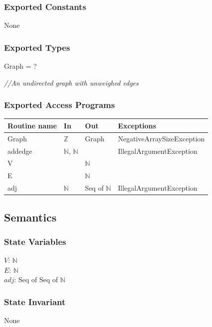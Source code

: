 \documentclass[12pt]{article}
\begin{document}
\subsubsection* {Exported Constants}

None

\subsubsection* {Exported Types}

Graph = ?

\noindent \textit{//An undirected graph with unweighed edges}

\subsubsection* {Exported Access Programs}

\begin{tabular}{| l | l | l | l |}
\hline
\textbf{Routine name} & \textbf{In} & \textbf{Out} & \textbf{Exceptions}\\
\hline
Graph & $\mathbb{Z}$ & Graph & NegativeArraySizeException\\
\hline
addedge & $\mathbb{N}$, $\mathbb{N}$ & ~ & IllegalArgumentException\\
\hline
V & ~ & $\mathbb{N}$ & ~\\
\hline
E & ~ & $\mathbb{N}$ & ~\\
\hline
adj & $\mathbb{N}$ & Seq of $\mathbb{N}$ & IllegalArgumentException\\
\hline
\end{tabular}


\subsection* {Semantics}

\subsubsection* {State Variables}

$V$: $\mathbb{N}$\\
$E$: $\mathbb{N}$\\
$adj$: Seq of Seq of $\mathbb{N}$

\subsubsection* {State Invariant}

None
\end{document}
